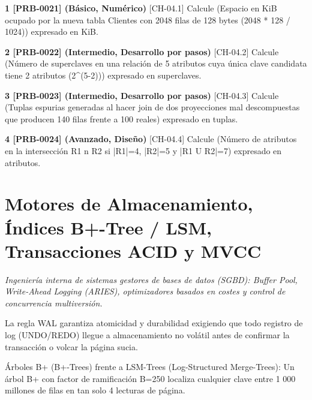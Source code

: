 \documentclass{book}
\begin{document}
\begin{tcolorbox}[title={Ejercicios}, studiumworked, breakable]

\noindent\textbf{1 [PRB-0021] (Básico, Numérico)}
[CH-04.1] Calcule (Espacio en KiB ocupado por la nueva tabla Clientes con 2048 filas de 128 bytes (2048 * 128 / 1024)) expresado en KiB.

\noindent\textbf{2 [PRB-0022] (Intermedio, Desarrollo por pasos)}
[CH-04.2] Calcule (Número de superclaves en una relación de 5 atributos cuya única clave candidata tiene 2 atributos (2\textasciicircum{}(5-2))) expresado en superclaves.

\noindent\textbf{3 [PRB-0023] (Intermedio, Desarrollo por pasos)}
[CH-04.3] Calcule (Tuplas espurias generadas al hacer join de dos proyecciones mal descompuestas que producen 140 filas frente a 100 reales) expresado en tuplas.

\noindent\textbf{4 [PRB-0024] (Avanzado, Diseño)}
[CH-04.4] Calcule (Número de atributos en la intersección R1 n R2 si |R1|=4, |R2|=5 y |R1 U R2|=7) expresado en atributos.
\end{tcolorbox}

\chapter{Motores de Almacenamiento, Índices B+-Tree / LSM, Transacciones ACID y MVCC}
\label{chap:ch-05}

\noindent\textit{Ingeniería interna de sistemas gestores de bases de datos (SGBD): Buffer Pool, Write-Ahead Logging (ARIES), optimizadores basados en costes y control de concurrencia multiversión.}

\begin{tcolorbox}[title={Consejo}, studiumtip, breakable]

La regla WAL garantiza atomicidad y durabilidad exigiendo que todo registro de log (UNDO/REDO) llegue a almacenamiento no volátil antes de confirmar la transacción o volcar la página sucia.
\end{tcolorbox}

\begin{tcolorbox}[title={Definición}, studiumdef, breakable]

Árboles B+ (B+-Trees) frente a LSM-Trees (Log-Structured Merge-Trees): Un árbol B+ con factor de ramificación B=250 localiza cualquier clave entre 1 000 millones de filas en tan solo 4 lecturas de página.
\end{tcolorbox}
\end{document}
